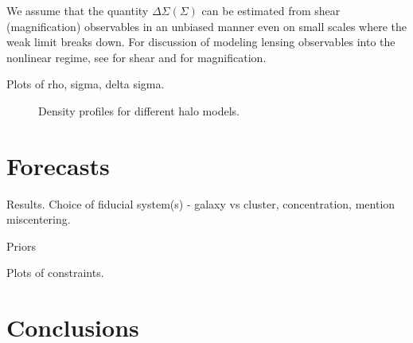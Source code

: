 \documentclass[12pt]{emulateapj}
\begin{document}
We assume that the quantity $\Delta\Sigma (\Sigma)$ can be estimated
from shear (magnification) observables in an unbiased manner even on
small scales where the weak limit breaks down. For discussion of
modeling lensing observables into the nonlinear regime, see \citet{}
for shear and \citet{Menard2003, Takada2003} for magnification.

Plots of rho, sigma, delta sigma.

\begin{figure*}[htb]
\caption{Density profiles for different halo models.}
\label{fig:compareAC}
\end{figure*}


\section{Forecasts}

Results. Choice of fiducial system(s) - galaxy vs cluster, concentration, mention
miscentering.

Priors

Plots of constraints.

\section{Conclusions}



\acknowledgments 

\mbox{~} %


%



\end{document}
